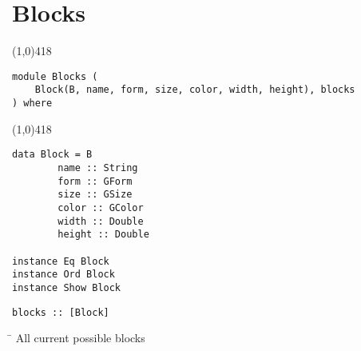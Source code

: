 \section{Blocks}
\begin{center}
\line(1,0){418}
\end{center}
\begin{verbatim}
module Blocks (
    Block(B, name, form, size, color, width, height), blocks
) where
\end{verbatim}
\begin{center}
\line(1,0){418}
\end{center}
\begin{verbatim}
data Block = B
        name :: String
        form :: GForm
        size :: GSize
        color :: GColor
        width :: Double
        height :: Double

instance Eq Block
instance Ord Block
instance Show Block
\end{verbatim}
\begin{verbatim}
blocks :: [Block]
\end{verbatim}
\begin{tabbing}
\hspace*{1cm}\= \kill
\> All current possible blocks
\end{tabbing}
